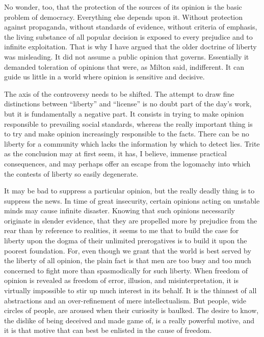 \documentclass[openany,nobib,nohyper]{tufte-book}
\begin{document}
No wonder, too, that the protection of the sources of its opinion is the
basic problem of democracy. Everything else depends upon it. Without
protection against propaganda, without standards of evidence, without
criteria of emphasis, the living substance of all popular decision is
exposed to every prejudice and to infinite exploitation. That is why I
have argued that the older doctrine of liberty was misleading. It did
not assume a public opinion that governs. Essentially it demanded
toleration of opinions that were, as Milton said, indifferent. It can
guide us little in a world where opinion is sensitive and decisive.

The axis of the controversy needs to be shifted. The attempt to draw
fine distinctions between ``liberty'' and ``license'' is no doubt part
of the day's work, but it is fundamentally a negative part. It consists
in trying to make opinion responsible to prevailing social standards,
whereas the really important thing is to try and make opinion
increasingly responsible to the facts. There can be no liberty for a
community which lacks the information by which to detect lies. Trite as
the conclusion may at first seem, it has, I believe, immense practical
consequences, and may perhaps offer an escape from the logomachy into
which the contests of liberty so easily degenerate.

It may be bad to suppress a particular opinion, but the really deadly
thing is to suppress the news. In time of great insecurity, certain
opinions acting on unstable minds may cause infinite disaster. Knowing
that such opinions necessarily originate in slender evidence, that they
are propelled more by prejudice from the rear than by reference to
realities, it seems to me that to build the case for liberty upon the
dogma of their unlimited prerogatives is to build it upon the poorest
foundation. For, even though we grant that the world is best served by
the liberty of all opinion, the plain fact is that men are too busy and
too much concerned to fight more than spasmodically for such liberty.
When freedom of opinion is revealed as freedom of error, illusion, and
misinterpretation, it is virtually impossible to stir up much interest
in its behalf. It is the thinnest of all abstractions and an
over-refinement of mere intellectualism. But people, wide circles of
people, are aroused when their curiosity is baulked. The desire to know,
the dislike of being deceived and made game of, is a really powerful
motive, and it is that motive that can best be enlisted in the cause of
freedom.
\end{document}
